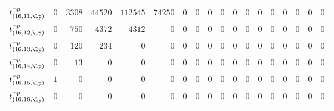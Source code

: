 \begin{tabular}{r|rrrrrrrrrrrrrrrrr}
  $t^{\neg p}_{(16,11,\Lp)}$ & $0$ & $3308$ & $44520$ & $112545$ & $74250$ & $0$ & $0$ & $0$ & $0$ & $0$ & $0$ & $0$ & $0$ & $0$ & $0$ & $0$ & $0$ \\
  $t^{\neg p}_{(16,12,\Lp)}$ & $0$ & $750$ & $4372$ & $4312$ & $0$ & $0$ & $0$ & $0$ & $0$ & $0$ & $0$ & $0$ & $0$ & $0$ & $0$ & $0$ & $0$ \\
  $t^{\neg p}_{(16,13,\Lp)}$ & $0$ & $120$ & $234$ & $0$ & $0$ & $0$ & $0$ & $0$ & $0$ & $0$ & $0$ & $0$ & $0$ & $0$ & $0$ & $0$ & $0$ \\
  $t^{\neg p}_{(16,14,\Lp)}$ & $0$ & $13$ & $0$ & $0$ & $0$ & $0$ & $0$ & $0$ & $0$ & $0$ & $0$ & $0$ & $0$ & $0$ & $0$ & $0$ & $0$ \\
  $t^{\neg p}_{(16,15,\Lp)}$ & $1$ & $0$ & $0$ & $0$ & $0$ & $0$ & $0$ & $0$ & $0$ & $0$ & $0$ & $0$ & $0$ & $0$ & $0$ & $0$ & $0$ \\
  $t^{\neg p}_{(16,16,\Lp)}$ & $0$ & $0$ & $0$ & $0$ & $0$ & $0$ & $0$ & $0$ & $0$ & $0$ & $0$ & $0$ & $0$ & $0$ & $0$ & $0$ & $0$ \\
\end{tabular}
